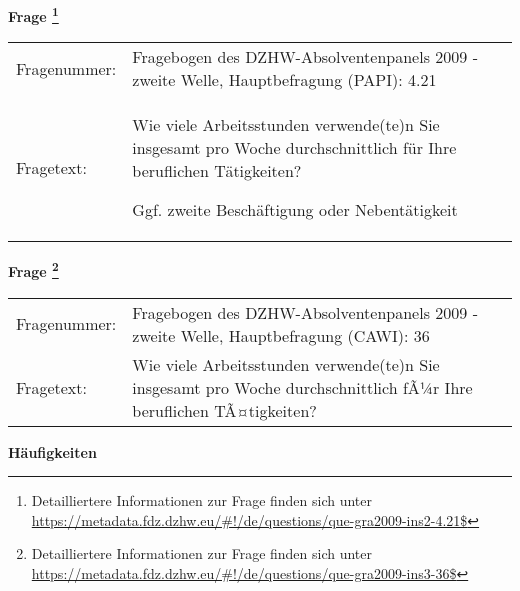 				\vspace*{0.5cm}
                \noindent\textbf{Frage
	                \footnote{Detailliertere Informationen zur Frage finden sich unter
		              \url{https://metadata.fdz.dzhw.eu/\#!/de/questions/que-gra2009-ins2-4.21$}}}\\
				\begin{tabularx}{\hsize}{@{}lX}
					Fragenummer: &
					  Fragebogen des DZHW-Absolventenpanels 2009 - zweite Welle, Hauptbefragung (PAPI):
					  4.21
 \\
					Fragetext: & Wie viele Arbeitsstunden verwende(te)n Sie insgesamt pro Woche durchschnittlich für Ihre beruflichen Tätigkeiten?\par  Ggf. zweite Beschäftigung oder Nebentätigkeit \\
				\end{tabularx}
				\vspace*{0.5cm}
                \noindent\textbf{Frage
	                \footnote{Detailliertere Informationen zur Frage finden sich unter
		              \url{https://metadata.fdz.dzhw.eu/\#!/de/questions/que-gra2009-ins3-36$}}}\\
				\begin{tabularx}{\hsize}{@{}lX}
					Fragenummer: &
					  Fragebogen des DZHW-Absolventenpanels 2009 - zweite Welle, Hauptbefragung (CAWI):
					  36
 \\
					Fragetext: & Wie viele Arbeitsstunden verwende(te)n Sie insgesamt pro Woche durchschnittlich fÃ¼r Ihre beruflichen TÃ¤tigkeiten? \\
				\end{tabularx}





        		\vspace*{0.5cm}
                \noindent\textbf{Häufigkeiten}

